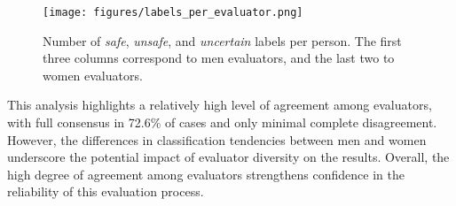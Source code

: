 \begin{figure}[h]
    \centering
    \texttt{[image: figures/labels\_per\_evaluator.png]}
    \caption{Number of \textit{safe}, \textit{unsafe}, and \textit{uncertain} labels per person. The first three columns correspond to men evaluators, and the last two to women evaluators.}
    \label{fig:labels_per_evaluator} 
\end{figure}


This analysis highlights a relatively high level of agreement among evaluators, with full consensus in 72.6\% of cases and only minimal complete disagreement. However, the differences in classification tendencies between men and women underscore the potential impact of evaluator diversity on the results. Overall, the high degree of agreement among evaluators strengthens confidence in the reliability of this evaluation process. 